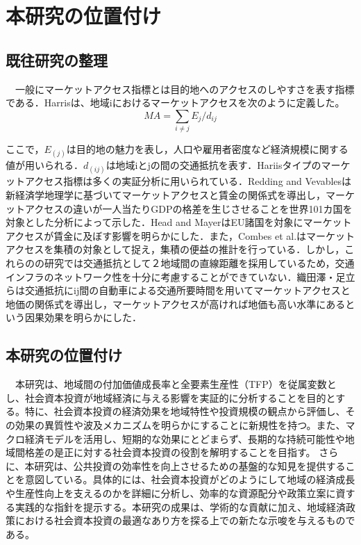 \chapter{本研究の位置付け}

\section{既往研究の整理}
　一般にマーケットアクセス指標とは目的地へのアクセスのしやすさを表す指標である．Harris\cite{harrisc1954}は、地域iにおけるマーケットアクセスを次のように定義した。
\[ MA = \sum_{i \neq j}{E_{j}/d_{ij}}\]

ここで，$E_(j)$は目的地の魅力を表し，人口や雇用者密度など経済規模に関する値が用いられる．$d_(ij)$は地域iとjの間の交通抵抗を表す．Hariisタイプのマーケットアクセス指標は多くの実証分析に用いられている．Redding and Vevables\cite{redding2004}は新経済学地理学に基づいてマーケットアクセスと賃金の関係式を導出し，マーケットアクセスの違いが一人当たりGDPの格差を生じさせることを世界101カ国を対象とした分析によって示した．Head and Mayer\cite{head2006}はEU諸国を対象にマーケットアクセスが賃金に及ぼす影響を明らかにした．また，Combes et al.\cite{combes2010}はマーケットアクセスを集積の対象として捉え，集積の便益の推計を行っている．しかし，これらのの研究では交通抵抗として２地域間の直線距離を採用しているため，交通インフラのネットワーク性を十分に考慮することができていない．織田澤・足立ら\cite{otazawa2022}は交通抵抗にij間の自動車による交通所要時間を用いてマーケットアクセスと地価の関係式を導出し，マーケットアクセスが高ければ地価も高い水準にあるという因果効果を明らかにした．
 
\section{本研究の位置付け}
　本研究は、地域間の付加価値成長率と全要素生産性（TFP）を従属変数とし、社会資本投資が地域経済に与える影響を実証的に分析することを目的とする。特に、社会資本投資の経済効果を地域特性や投資規模の観点から評価し、その効果の異質性や波及メカニズムを明らかにすることに新規性を持つ。また、マクロ経済モデルを活用し、短期的な効果にとどまらず、長期的な持続可能性や地域間格差の是正に対する社会資本投資の役割を解明することを目指す。
さらに、本研究は、公共投資の効率性を向上させるための基盤的な知見を提供することを意図している。具体的には、社会資本投資がどのようにして地域の経済成長や生産性向上を支えるのかを詳細に分析し、効率的な資源配分や政策立案に資する実践的な指針を提示する。本研究の成果は、学術的な貢献に加え、地域経済政策における社会資本投資の最適なあり方を探る上での新たな示唆を与えるものである。
